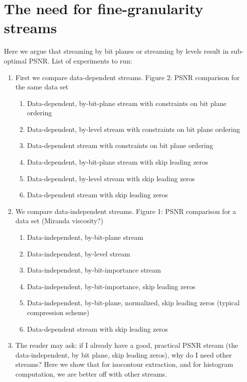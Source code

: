 \section{The need for fine-granularity streams}
Here we argue that streaming by bit planes or streaming by levels result in sub-optimal PSNR.
List of experiments to run:

\begin{enumerate}
    \item First we compare data-dependent streams. Figure 2: PSNR comparison for the same data set
  \begin{enumerate}
    \item Data-dependent, by-bit-plane stream with constraints on bit plane ordering
    \item Data-dependent, by-level stream with constraints on bit plane ordering
    \item Data-dependent stream with constraints on bit plane ordering
    \item Data-dependent, by-bit-plane stream with skip leading zeros
    \item Data-dependent, by-level stream with skip leading zeros
    \item Data-dependent stream with skip leading zeros
  \end{enumerate}
  \item We compare data-independent streams. Figure 1: PSNR comparison for a data set (Miranda viscosity?)
    \begin{enumerate}
      \item Data-independent, by-bit-plane stream
      \item Data-independent, by-level stream
      \item Data-independent, by-bit-importance stream
      \item Data-independent, by-bit-importance, skip leading zeros
      \item Data-independent, by-bit-plane, normalized, skip leading zeros (typical compression scheme)      
      \item Data-dependent stream with skip leading zeros
    \end{enumerate}
  \item The reader may ask: if I already have a good, practical PSNR stream (the data-independent, by bit plane, skip leading zeros), why do I need other streams? Here we show that for isocontour extraction, and for histogram computation, we are better off with other streams.
  

\end{enumerate}
